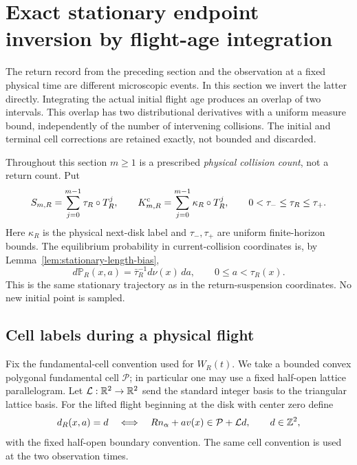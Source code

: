 \section{Exact stationary endpoint inversion by flight-age integration}
\label{sec:exact-stationary-endpoint}
The return record from the preceding section and the observation at a
fixed physical time are different microscopic events. In this section
we invert the latter directly. Integrating the actual initial flight
age produces an overlap of two intervals. This overlap has two
distributional derivatives with a uniform measure bound, independently
of the number of intervening collisions. The initial and terminal
cell corrections are retained exactly, not bounded and discarded.

Throughout this section $m\ge1$ is a prescribed \emph{physical collision
count}, not a return count. Put
\[
 S_{m,R}=\sum_{j=0}^{m-1}\tau_R\circ T_R^j,\qquad
 K^{\rm c}_{m,R}=\sum_{j=0}^{m-1}\kappa_R\circ T_R^j,
 \qquad 0<\tau_-\le\tau_R\le\tau_+.
\]
Here $\kappa_R$ is the physical next-disk label and $\tau_-,\tau_+$
are uniform finite-horizon bounds. The equilibrium probability in
current-collision coordinates is, by
Lemma~\ref{lem:stationary-length-bias},
\begin{equation}\label{eq:stationary-endpoint-source}
 d\mathbb P_R(x,a)=\bar\tau_R^{-1}d\nu(x)\,da,
                    \qquad 0\le a<\tau_R(x).
\end{equation}
This is the same stationary trajectory as in the return-suspension
coordinates. No new initial point is sampled.

\subsection{Cell labels during a physical flight}
Fix the fundamental-cell convention used for $W_R(t)$. We take a
bounded convex polygonal fundamental cell $\mathcal P$; in particular
one may use a fixed half-open lattice parallelogram. Let
$\mathcal L:\mathbb R^2\to\mathbb R^2$ send the standard integer basis to the
triangular lattice basis. For the lifted flight beginning at the disk
with center zero define
\begin{equation}\label{eq:within-flight-cell}
 d_R(x,a)=d\quad\Longleftrightarrow\quad
 Rn_\alpha+a v(x)\in\mathcal P+\mathcal Ld,
                \qquad d\in\Z^2,
\end{equation}
with the fixed half-open boundary convention. The same cell convention
is used at the two observation times.

